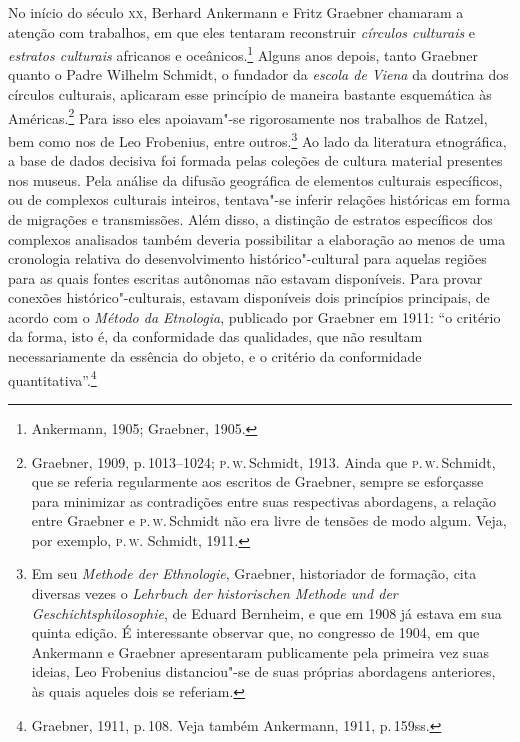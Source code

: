 No início do século \textsc{xx}, Berhard Ankermann e Fritz Graebner
chamaram a atenção com trabalhos, em que eles tentaram
reconstruir \textit{círculos culturais} e \textit{estratos culturais} africanos e
oceânicos.\footnote{Ankermann, 1905; Graebner, 1905.} Alguns anos
depois, tanto Graebner quanto o Padre Wilhelm Schmidt, o
fundador da \textit{escola de Viena} da doutrina dos círculos culturais,
aplicaram esse princípio de maneira bastante esquemática às
Américas.\footnote{Graebner, 1909, p.\,1013--1024; \textsc{p}.\,\textsc{w}.\,Schmidt, 1913.
  Ainda que \textsc{p}.\,\textsc{w}.\,Schmidt, que se referia regularmente aos escritos de
  Graebner, sempre se esforçasse para minimizar as contradições entre
  suas respectivas abordagens, a relação entre Graebner e \textsc{p}.\,\textsc{w}.\,Schmidt
  não era livre de tensões de modo algum. Veja, por exemplo, \textsc{p}.\,\textsc{w}. Schmidt, 1911.} Para isso eles apoiavam"-se rigorosamente nos trabalhos
de Ratzel, bem como nos de Leo Frobenius, entre
outros.\footnote{Em seu \textit{Methode der Ethnologie}, Graebner, historiador de formação, cita diversas vezes
  o \textit{Lehrbuch der historischen Methode und der
  Geschichtsphilosophie}, de Eduard Bernheim, e que em 1908 já estava em sua quinta
  edição. É interessante observar que, no congresso de 1904, em que
  Ankermann e Graebner apresentaram publicamente pela primeira vez suas
  ideias, Leo Frobenius distanciou"-se de suas próprias abordagens
  anteriores, às quais aqueles dois se referiam.} Ao lado da literatura
etnográfica, a base de dados decisiva foi formada pelas coleções de
cultura material presentes nos museus. Pela análise da difusão
geográfica de elementos culturais específicos, ou de complexos
culturais inteiros, tentava"-se inferir relações históricas em forma de
migrações e transmissões. Além disso, a distinção de estratos
específicos dos complexos analisados também deveria possibilitar a
elaboração ao menos de uma cronologia relativa do desenvolvimento
histórico"-cultural para aquelas regiões para as quais fontes escritas
autônomas não estavam disponíveis. Para provar conexões
histórico"-culturais, estavam disponíveis dois princípios principais, de
acordo com o \textit{Método da Etnologia},
publicado por Graebner em 1911: ``o critério da forma, isto é, da
conformidade das qualidades, que não resultam necessariamente da
essência do objeto, e o critério da conformidade quantitativa''.\footnote{Graebner, 1911, p.\,108. Veja também Ankermann, 1911, p.\,159ss.}

